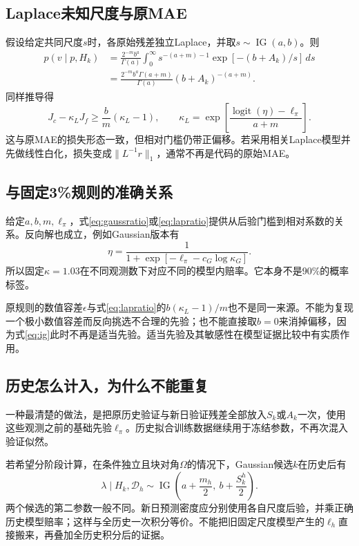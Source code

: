 \documentclass[UTF8,11pt,a4paper,fontset=fandol]{ctexart}
\newcommand{\logit}{\operatorname{logit}}
\newcommand{\IG}{\operatorname{IG}}
\numberwithin{equation}{section}
\begin{document}
\subsection{Laplace未知尺度与原MAE}
假设给定共同尺度$s$时，各原始残差独立Laplace，并取$s\sim\IG(a,b)$。则
\begin{align}
p(v\mid p,H_k)
&=\frac{2^{-m}b^a}{\Gamma(a)}
\int_0^\infty s^{-(a+m)-1}\exp[-(b+A_k)/s]\,ds\\
&=\frac{2^{-m}b^a\Gamma(a+m)}{\Gamma(a)}(b+A_k)^{-(a+m)}.
\end{align}
同样推导得
\begin{equation}
\boxed{
J_c-\kappa_LJ_f\ge\frac{b}{m}(\kappa_L-1),\qquad
\kappa_L=\exp\!\left[\frac{\logit(\eta)-\ell_\pi}{a+m}\right].}
\label{eq:lapratio}
\end{equation}
这与原MAE的损失形态一致，但相对门槛仍带正偏移。若采用相关Laplace模型并先做线性白化，损失变成$\|L^{-1}r\|_1$，通常不再是代码的原始MAE。

\subsection{与固定3\%规则的准确关系}
给定$a,b,m,\ell_\pi$，式\eqref{eq:gaussratio}或\eqref{eq:lapratio}提供从后验门槛到相对系数的关系。反向解也成立，例如Gaussian版本有
\begin{equation}
\eta=\frac{1}{1+\exp[-\ell_\pi-c_G\log\kappa_G]}.
\label{eq:reverseeta}
\end{equation}
所以固定$\kappa=1.03$在不同观测数下对应不同的模型内赔率。它本身不是90\%的概率标签。

原规则的数值容差$\epsilon$与式\eqref{eq:lapratio}的$b(\kappa_L-1)/m$也不是同一来源。不能为复现一个极小数值容差而反向挑选不合理的先验；也不能直接取$b=0$来消掉偏移，因为式\eqref{eq:ig}此时不再是适当先验。适当先验及其敏感性在模型证据比较中有实质作用\cite{KassRaftery1995}。

\subsection{历史怎么计入，为什么不能重复}
一种最清楚的做法，是把原历史验证与新日验证残差全部放入$S_k$或$A_k$一次，使用这些观测之前的基础先验$\ell_\pi$。历史拟合训练数据继续用于冻结参数，不再次混入验证似然。

若希望分阶段计算，在条件独立且块对角$\Omega$的情况下，Gaussian候选$k$在历史后有
\begin{equation}
\lambda\mid H_k,\mathcal D_h\sim
\IG\left(a+\frac{m_h}{2},\ b+\frac{S_k^h}{2}\right).
\end{equation}
两个候选的第二参数一般不同。新日预测密度应分别使用各自尺度后验，并乘正确历史模型赔率；这样与全历史一次积分等价。不能把旧固定尺度模型产生的$\ell_h$直接搬来，再叠加全历史积分后的证据。
\end{document}
